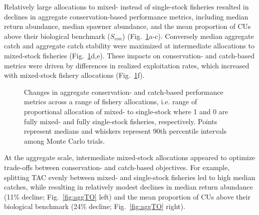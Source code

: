 \documentclass[11pt]{book}
\begin{document}
Relatively large allocations to mixed- instead of single-stock fisheries resulted in declines in aggregate conservation-based performance metrics, including median return abundance, median spawner abundance, and the mean proportion of CUs above their biological benchmark (\(S_{con}\)) (Fig.~\ref{fig:aggDot}a-c). Conversely median aggregate catch and aggregate catch stability were maximized at intermediate allocations to mixed-stock fisheries (Fig.~\ref{fig:aggDot}d,e). These impacts on conservation- and catch-based metrics were driven by differences in realized exploitation rates, which increased with mixed-stock fishery allocations (Fig.~\ref{fig:aggDot}f).
\begin{figure}[htb]

{\centering {} 

}

\caption{Changes in aggregate conservation- and catch-based performance metrics across a range of fishery allocations, i.e. range of proportional allocation of mixed- to single-stock where 1 and 0 are fully mixed- and fully single-stock fisheries, respectively. Points represent medians and whiskers represent 90th percentile intervals among Monte Carlo trials.}\label{fig:aggDot}
\end{figure}
At the aggregate scale, intermediate mixed-stock allocations appeared to optimize trade-offs between conservation- and catch-based objectives. For example, splitting TAC evenly between mixed- and single-stock fisheries led to high median catches, while resulting in relatively modest declines in median return abundance (11\% decline; Fig.~\ref{fig:aggTO} left) and the mean proportion of CUs above their biological benchmark (24\% decline; Fig.~\ref{fig:aggTO} right).
\end{document}
